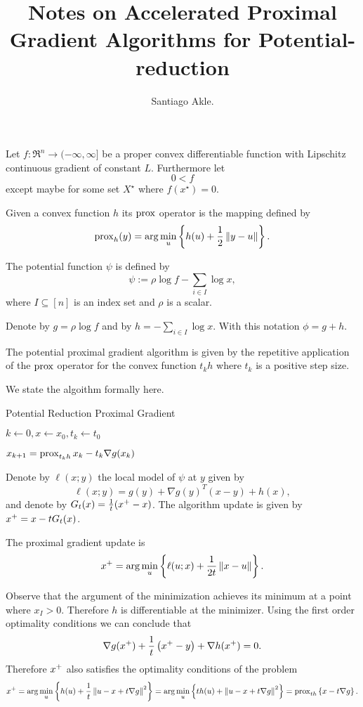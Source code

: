 \documentclass[smallextended]{svjour3}       %
\title{Notes on Accelerated Proximal Gradient Algorithms for Potential-reduction}
\author{
   Santiago Akle.
}
\begin{document}
\maketitle

Let $f:\Re^n\to(-\infty,\infty]$ be a proper convex differentiable function
with Lipschitz continuous gradient of constant $L$. Furthermore let
\[0 < f\] except maybe for some set $X^{\star}$ where $f(x^\star) = 0$.

Given a convex function $h$ its $\operatorname{prox}$ operator is the mapping defined by
\[
\operatorname{prox}_{h}(y) = \arg \min_u\left\{h(u) + \frac{1}{2}\left\| y-u \right\|\right\}.
\]

The potential function $\psi$ is defined by
\[
\psi := \rho \log{f} - \sum_{i\in I}\log{x},
\]
where $I\subseteq [n]$ is an index set and $\rho$ is a scalar.

Denote by
$g = \rho \log{f}$ and by $h = -\sum_{i\in I} \log{x}$. 
With this notation $\phi = g+h$.

The potential proximal gradient algorithm is given by the repetitive application
of the $\operatorname{prox}$ operator for the convex function $t_kh$ where $t_k$ is a
positive step size.

We state the algoithm formally here.

\begin{algorithm}{Potential Reduction Proximal Gradient}
  \caption{Proximal Gradient}
  \begin{algorithmic}
  \STATE $k \gets 0, x \gets x_0, t_k \gets t_0$

    \STATE $x_{k+1} = \operatorname{prox}_{t_kh}{x_k - t_k \nabla g(x_k)}$
  \ENDWHILE
  \end{algorithmic}
  \label{alg:ppg}
\end{algorithm}


Denote by $\ell(x;y)$ the local model of $\psi$ at $y$ given by
\[
\ell(x;y) = g(y) + \nabla g(y)^T(x-y) +  h(x),
\]
and denote by $G_t(x) = \frac{1}{t}(x^+ - x)$. 
The algorithm update is given by $x^+ = x-tG_t(x)$.

\begin{clm}
The proximal gradient update is 
\[
    x^+ = \arg \min_u\left\{ \ell(u;x) + \frac{1}{2t}\left\| x-u \right\| \right\}.
\] 
\end{clm}

\begin{prf}
  Observe that the argument of the minimization achieves its minimum at a 
  point where $x_I>0$. Therefore $h$ is differentiable at the minimizer.
  Using the first order optimality conditions we can conclude that
  \[
  \nabla g(x^+) + \frac{1}{t}\left( x^+ - y \right) + \nabla h(x^+)= 0.
  \]
  Therefore $x^+$ also satisfies the optimality conditions of the problem 
  \[
  x^+ = \arg \min_u \left\{ h(u) + \frac{1}{t}\left\| u - x + t\nabla g \right\|^2 \right\} 
      = \arg \min_u\left\{ th(u) + \left\| u - x + t\nabla g \right\|^2 \right\} 
      = \operatorname{prox}_{th}\left\{ x - t\nabla g \right\}.
  \] 
\end{prf}
\end{document}
